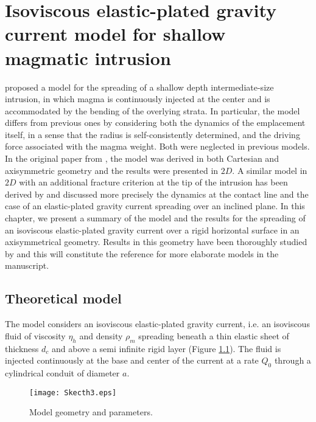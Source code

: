 \chapter[Isoviscous elastic-plated  gravity current]{Isoviscous elastic-plated  gravity current model  for shallow
  magmatic intrusion}

\label{chap2} 
\minitoc

\citet{Michaut:2011kg} proposed a model for the spreading of a shallow
depth  intermediate-size intrusion,  in  which  magma is  continuously
injected  at the  center and  is accommodated  by the  bending of  the
overlying strata.  In particular, the model differs from previous ones
by considering both the dynamics of the emplacement itself, in a sense
that the radius is self-consistently determined, and the driving force
associated with  the magma  weight.  Both  were neglected  in previous
models.  In the original  paper from \citet{Michaut:2011kg}, the model
was  derived  in both  Cartesian  and  axisymmetric geometry  and  the
results  were presented  in $2D$.   A similar  model in  $2D$ with  an
additional fracture  criterion at  the tip of  the intrusion  has been
derived   by   \citet{Bunger:2011cb}  and   \citet{Anonymous:QWXp_4JV}
discussed more precisely the dynamics at the contact line and the case
of an elastic-plated gravity current spreading over an inclined plane.
In this chapter, we present a summary of the model and the results for
the spreading of  an isoviscous elastic-plated gravity  current over a
rigid horizontal  surface in  an axisymmetrical geometry.   Results in
this geometry  have been  thoroughly studied  by \citet{Lister:2013ia}
and this  will constitute the  reference for more elaborate  models in
the manuscript.

\section{Theoretical model}
\label{C2-sec:model}

The model considers an isoviscous elastic-plated gravity current, i.e.
an  isoviscous  fluid  of  viscosity  $\eta_h$  and  density  $\rho_m$
spreading beneath a thin elastic sheet  of thickness $d_c$ and above a
semi infinite rigid layer \citep{Michaut:2011kg,Bunger:2011cb} (Figure
\ref{C2-Sketch}).  The fluid is injected  continuously at the base and
center of the current at a rate $Q_0$ through a cylindrical conduit of
diameter $a$.

\begin{figure}[h!]
  \begin{center}
    \graphicspath{ {/Users/thorey/Documents/These/Manuscript/Figure/Chapter2/} }
    \texttt{[image: Skecth3.eps]}
    \caption{Model geometry and parameters.}
    \label{C2-Sketch}
  \end{center}
\end{figure}

